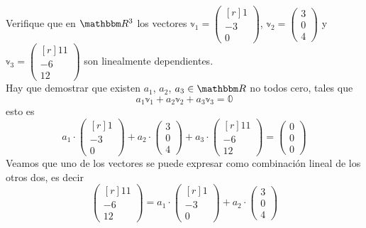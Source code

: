 \begin{example}
    Verifique que en $\RR[3]$ los vectores $\displaystyle \mathbb{v}_1 = \begin{pmatrix*}[r] 1 \\ -3 \\ 0 \end{pmatrix*}$, $\displaystyle \mathbb{v}_2 = \begin{pmatrix} 3 \\ 0 \\ 4 \end{pmatrix}$ y $\displaystyle \mathbb{v}_3 = \begin{pmatrix*}[r] 11 \\ -6 \\ 12 \end{pmatrix*}$ son linealmente dependientes. \\
    \solucion Hay que demostrar que existen $a_1$, $a_2$, $a_3 \in \RR$ no todos cero, tales que
    $$a_1\mathbb{v}_1 + a_2\mathbb{v}_2 + a_3\mathbb{v}_3 = \mathbb{0}$$
    esto es
    \begin{equation}
        a_1 \cdot \begin{pmatrix*}[r] 1 \\ -3 \\ 0 \end{pmatrix*} + a_2 \cdot \begin{pmatrix} 3 \\ 0 \\ 4 \end{pmatrix} + a_3 \cdot \begin{pmatrix*}[r] 11 \\ -6 \\ 12 \end{pmatrix*} = \begin{pmatrix} 0 \\ 0 \\ 0 \end{pmatrix} \label{ec22}
    \end{equation}
    Veamos que uno de los vectores se puede expresar como combinación lineal de los otros dos, es decir
    $$\begin{pmatrix*}[r] 11 \\ -6 \\ 12 \end{pmatrix*} = a_1 \cdot \begin{pmatrix*}[r] 1 \\ -3 \\ 0 \end{pmatrix*} + a_2 \cdot \begin{pmatrix} 3 \\ 0 \\ 4 \end{pmatrix}$$

\end{example}
